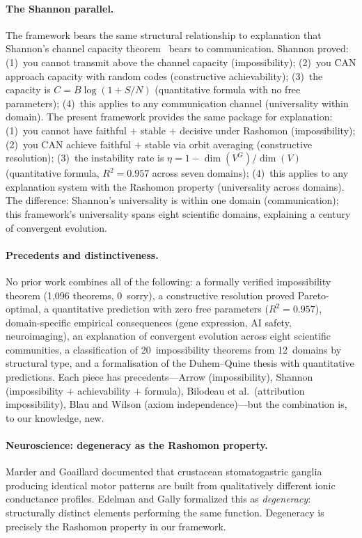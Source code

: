 \documentclass[11pt,a4paper]{article}
\begin{document}
\paragraph{The Shannon parallel.}
The framework bears the same structural relationship to explanation that
Shannon's channel capacity theorem~\citep{shannon1948mathematical} bears
to communication.  Shannon proved: (1)~you cannot transmit above the
channel capacity (impossibility); (2)~you CAN approach capacity with
random codes (constructive achievability); (3)~the capacity is
$C = B\log(1 + S/N)$ (quantitative formula with no free parameters);
(4)~this applies to any communication channel (universality within
domain).  The present framework provides the same package for explanation:
(1)~you cannot have faithful $+$ stable $+$ decisive under Rashomon
(impossibility); (2)~you CAN achieve faithful $+$ stable via orbit
averaging (constructive resolution); (3)~the instability rate is
$\eta = 1 - \dim(V^G)/\dim(V)$ (quantitative formula, $R^2 = 0.957$
across seven domains); (4)~this applies to any explanation system with
the Rashomon property (universality across domains).  The difference:
Shannon's universality is within one domain (communication); this
framework's universality spans eight scientific domains, explaining a
century of convergent evolution.

\paragraph{Precedents and distinctiveness.}
No prior work combines all of the following: a formally verified
impossibility theorem (1{,}096 theorems, 0~sorry), a constructive
resolution proved Pareto-optimal, a quantitative prediction with zero
free parameters ($R^2 = 0.957$), domain-specific empirical consequences
(gene expression, AI safety, neuroimaging), an explanation of convergent
evolution across eight scientific communities, a classification of
20~impossibility theorems from 12~domains by structural type, and a
formalisation of the Duhem--Quine thesis with quantitative predictions.
Each piece has precedents---Arrow (impossibility), Shannon (impossibility
$+$ achievability $+$ formula), Bilodeau et al.\ (attribution
impossibility), Blau and Wilson (axiom independence)---but the
combination is, to our knowledge, new.

\paragraph{Neuroscience: degeneracy as the Rashomon property.}
Marder and Goaillard \citep{marder2006variability} documented that crustacean
stomatogastric ganglia producing identical motor patterns are built from
qualitatively different ionic conductance profiles.  Edelman and Gally
\citep{edelman2001degeneracy} formalized this as \emph{degeneracy}:
structurally distinct elements performing the same function.  Degeneracy is
precisely the Rashomon property in our framework.
\end{document}
